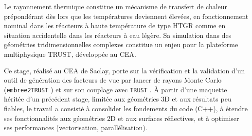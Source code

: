 \documentclass[a4paper, 11pt, english]{report}
\newcommand{\ETT}{\texttt{embree2TRUST} }
\newcommand{\trust}{\texttt{TRUST} }
\begin{document}
    
    \newpage 

    

    \newpage
    \tableofcontents

    \printglossary[type=\acronymtype, title=Liste des acronymes]%

    \listoffigures

    \listoftables


    \newpage
    
    
    
    
    
	
	

	
	
	
	
	
	

	
	
		\renewcommand{\thechapter}{}
	\renewcommand{\thesection}{\Alph{section}}
	\setcounter{section}{0}	

	
	

    \newpage
    
    
    \newpage
\vfill
{} 
\vspace{-13pt}

Le rayonnement thermique constitue un mécanisme de transfert de chaleur prépondérant dès lors que les températures deviennent élevées, en fonctionnement nominal dans les réacteurs à haute température de type HTGR comme en situation accidentelle dans les réacteurs à eau légère. Sa simulation dans des géométries tridimensionnelles complexes constitue un enjeu pour la plateforme multiphysique TRUST, développée au CEA.

Ce stage, réalisé au CEA de Saclay, porte sur la vérification et la validation d'un outil de génération des facteurs de vue par lancer de rayons Monte Carlo (\ETT) et sur son couplage avec \trust. À partir d'une maquette héritée d'un précédent stage, limitée aux géométries 3D et aux résultats peu fiables, le travail a consisté à consolider les fondements du code (C++), à étendre ses fonctionnalités aux géométries 2D et aux surfaces réflectives, et à optimiser ses performances (vectorisation, parallélisation).
\end{document}
